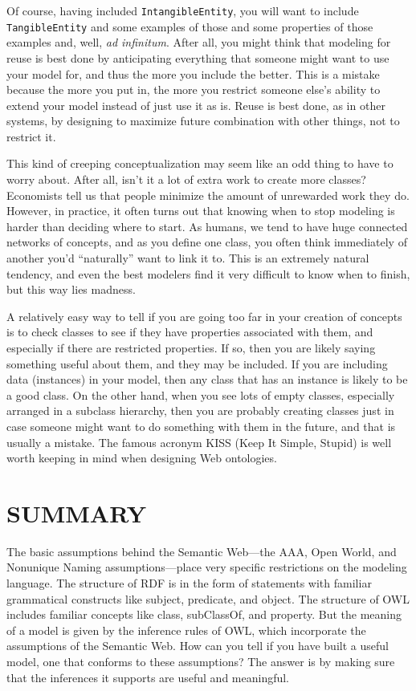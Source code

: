 Of course, having included \texttt{IntangibleEntity}, you will want to include
\texttt{TangibleEntity} 
and some examples of those and some properties of those examples and,
well, \emph{ad infinitum}. After all, you might think that modeling for reuse
is best done by anticipating everything that someone might want to use
your model for, and thus the more you include the better. This is a
mistake because the more you put in, the more you restrict someone
else's ability to extend your model instead of just use it
as is. Reuse is best done, as in other systems, by designing to maximize
future combination with other things, not to restrict it.

This kind of creeping conceptualization may seem like an odd thing to
have to worry about. After all, isn't it a lot of extra work to create
more classes? Economists tell us that people minimize the amount of
unrewarded work they do. However, in practice, it often turns out that
knowing when to stop modeling is harder than deciding where to start. As
humans, we tend to have huge connected networks of concepts, and as you
define one class, you often think immediately of another you'd
``naturally'' want to link it to. This is an extremely natural tendency,
and even the best modelers find it very difficult to know when to
finish, but this way lies madness.

A relatively easy way to tell if you are going too far in your creation
of concepts is to check classes to see if they have properties
associated with them, and especially if there are restricted properties.
If so, then you are likely saying something useful about them, and they
may be included. If you are including data (instances) in your model,
then any class that has an instance is likely to be a good class. On the
other hand, when you see lots of empty classes, especially arranged in a
subclass hierarchy, then you are probably creating classes just in case
someone might want to do something with them in the future, and that is
usually a mistake. The famous acronym KISS (Keep It Simple, Stupid) is
well worth keeping in mind when designing Web ontologies.

\section{SUMMARY}

The basic assumptions behind the Semantic Web---the AAA, Open World, and
Nonunique Naming assumptions---place very specific restrictions on the
modeling language. The structure of RDF is in the form of statements
with familiar grammatical constructs like subject, predicate, and
object. The structure of OWL includes familiar concepts like class,
subClassOf, and property. But the meaning of a model is given by the
inference rules of OWL, which incorporate the assumptions of the
Semantic Web. How can you tell if you have built a useful model, one
that conforms to these assumptions? The answer is by making sure that
the inferences it supports are useful and meaningful.

